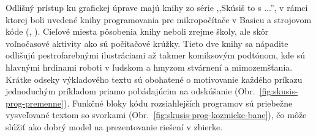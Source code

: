 Odlišný prístup ku grafickej úprave majú knihy zo série ,,Skúsiš to s ...'', v rámci ktorej boli uvedené knihy programovania pre mikropočítače v Basicu a strojovom kóde (\cite{tatchellova_skusis_1990}, \cite{wattsova_skusis_1991}). Cieľové miesta pôsobenia knihy neboli zrejme školy, ale skôr voľnočasové aktivity ako sú počítačové krúžky. Tieto dve knihy sa nápadite odlišujú pestrofarebnými ilustráciami až takmer komiksovým podtónom, kde sú hlavnými hrdinami roboti v ľudskom a hmyzom stvárnení a mimozemšťania. Krátke odseky výkladového textu sú obohatené o motivovanie každého príkazu jednoduchým príkladom priamo pobádajúcim na odskúšanie (Obr.~\ref{fig:skusis-prog-premenne}). Funkčné bloky kódu rozsiahlejších programov sú priebežne vysveľované textom so svorkami (Obr.~\ref{fig:skusis-prog-kozmicke-bane}), čo môže slúžiť ako dobrý model na prezentovanie riešení v zbierke.

